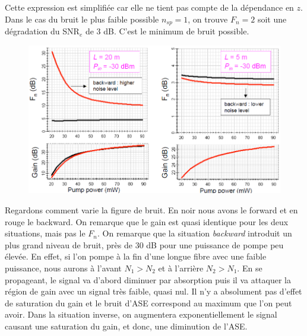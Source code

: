 Cette expression est simplifiée car elle ne tient pas compte de la dépendance en $z$. Dans le cas du bruit le 
plus faible possible $n_{sp}=1$, on trouve $F_n=2$ soit une dégradation du SNR$_e$ de 3 dB. C'est le minimum
de bruit possible.\newpage

	\begin{figure}
	\includegraphics[scale=0.4]{ch6/image12}
	\end{figure}
Regardons comment varie la figure de bruit. En noir nous avons le forward et en rouge le backward. On remarque 
que le gain est quasi identique pour les deux situations, mais pas le $F_n$. On remarque que la situation
\textit{backward} introduit un plus grand niveau de bruit, près de 30 dB pour une puissance de pompe peu 
élevée. En effet, si l'on pompe à la fin d'une longue fibre avec une faible puissance, nous aurons à l'avant
$N_1>N_2$ et à l'arrière $N_2>N_1$. En se propageant, le signal va d'abord diminuer par absorption puis il va
attaquer la région de gain avec un signal très faible, quasi nul. Il n'y a absolument pas d'effet de 
saturation du gain et le bruit d'ASE correspond au maximum que l'on peut avoir. Dans la situation inverse, on
augmentera exponentiellement le signal causant une saturation du gain, et donc, une diminution de l'ASE.

